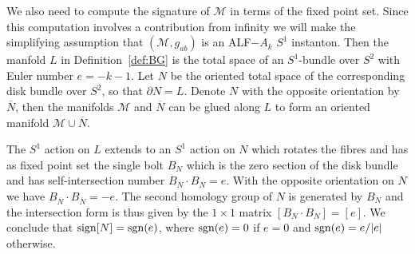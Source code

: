 \documentclass[a4paper,10pt,reqno]{amsart}
\newcommand{\sgn}{\mathop{\rm sgn}}
\newcommand{\sign}{\mathop{\rm sign}}
\newcommand{\cM}{\mathcal{M}}
\theoremstyle{plain}
\numberwithin{equation}{section}
\begin{document}
We also need to compute the signature of $\cM$ in terms of the fixed point set. Since this computation involves a contribution from infinity we will make the simplifying assumption that $(\cM, g_{ab})$ is an ALF$-A_k$ $S^1$ instanton. Then the manfold $L$ in Definition~\ref{def:BG} is the total space of an $S^1$-bundle over $S^2$ with Euler number $e = -k-1$. Let $N$ be the oriented total space of the corresponding disk bundle over $S^2$, so that $\partial N = L$. Denote $N$ with the opposite orientation by $\overline{N}$, then the manifolds $\cM$ and $\overline{N}$ can be glued along $L$ to form an oriented manifold $\cM \cup \overline{N}$. 

The $S^1$ action on $L$ extends to an $S^1$ action on $N$ which rotates the fibres and has as fixed point set the single bolt $B_N$ which is the zero section of the disk bundle and has self-intersection number $B_N \!\cdot\! B_N = e$. With the opposite orientation on $N$ we have $B_{\overline{N}} \! \cdot \! B_{\overline{N}} = -e$. The second homology group of $N$ is generated by $B_N$ and the intersection form is thus given by the $1 \times 1$ matrix $[B_N \! \cdot \! B_N] = [e]$. We conclude that $\sign[N] = \sgn(e)$, where $\sgn(e) = 0$ if $e=0$ and $\sgn(e) = e/|e|$ otherwise.
\end{document}
